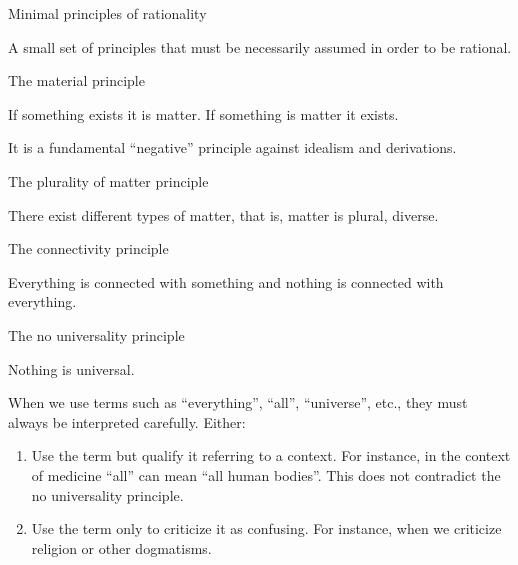 \documentclass{beamer}
\begin{document}
\begin{frame}{Minimal principles of rationality}

\Large A small set of principles that must be necessarily assumed in order to be rational.

\end{frame}

\begin{frame}{The material principle}

\begin{center}
{\Large If something exists it is matter. If something is matter it exists.\\}

It is a fundamental ``negative'' principle against idealism and derivations.
\end{center}

\end{frame}

\begin{frame}{The plurality of matter principle}

\begin{center}
\Large There exist different types of matter, that is, matter is plural, diverse.
\end{center}

\end{frame}

\begin{frame}{The connectivity principle}

\begin{center}
\Large Everything is connected with something and nothing is connected with everything.
\end{center}

\end{frame}

\begin{frame}{The no universality principle}

\begin{center}
{\Large Nothing is universal.}\\
\end{center}

\vspace{1cm}
When we use terms such as ``everything'', ``all'', ``universe'', etc., they must always be interpreted carefully. Either:
\begin{enumerate}
\item Use the term but qualify it referring to a context. For instance, in the context of medicine ``all'' can mean ``all human bodies''. This does not contradict the no universality principle.
\item Use the term only to criticize it as confusing. For instance, when we criticize religion or other dogmatisms.
\end{enumerate}
\end{frame}
\end{document}
